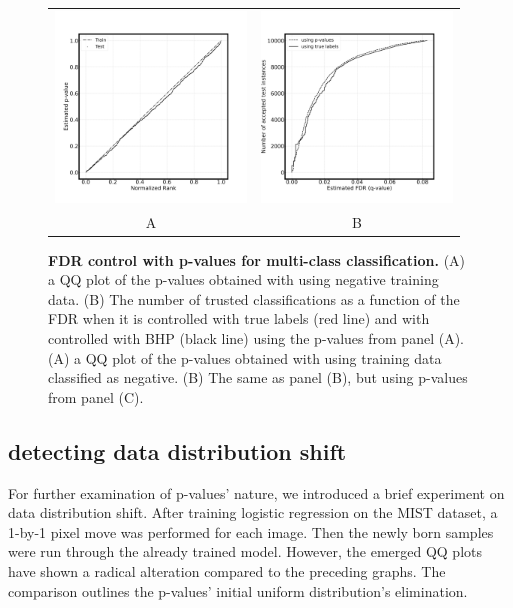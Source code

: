 \documentclass{article}
\begin{document}
\begin{figure}
    \centering
	\begin{tabular}{cc}
		\includegraphics[width=2in]{img/QQ_multi.png} &
		\includegraphics[width=2in]{img/test_pred_multi.png} \\	
		A & B \\
	\end{tabular}
	\caption{{\bf FDR control with p-values for multi-class classification.}
		(A) a QQ plot of the p-values obtained with using negative training data. (B) The number of trusted classifications as a function of the FDR when it is controlled with true labels (red line) and with controlled with BHP (black line) using the p-values from panel (A).
		(A) a QQ plot of the p-values obtained with using training data classified as negative. (B) The same as panel (B), but using p-values from panel (C).
	}
	\label{fig:examples}
\end{figure}


\subsection{detecting data distribution shift}

For further examination of p-values’ nature, we introduced a brief experiment on data distribution shift. After training logistic regression on the MIST dataset, a 1-by-1 pixel move was performed for each image. Then the newly born samples were run through the already trained model. However, the emerged QQ plots have shown a radical alteration compared to the preceding graphs. The comparison outlines the p-values’ initial uniform distribution’s elimination. 
\end{document}
